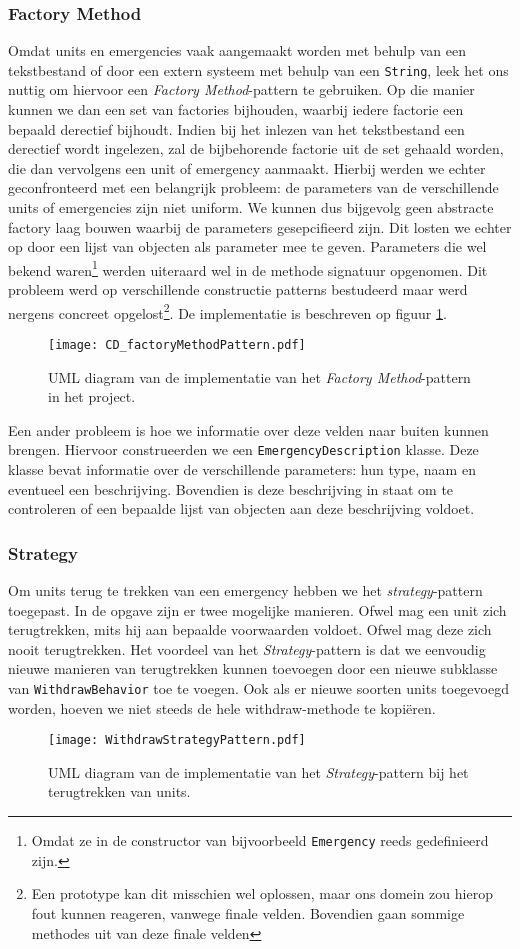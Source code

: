 \subsubsection{Factory Method}
Omdat units en emergencies vaak aangemaakt worden met behulp van een tekstbestand of door een extern systeem met behulp van een \verb+String+, leek het ons nuttig om hiervoor een \textit{Factory Method}-pattern te gebruiken. Op die manier kunnen we dan een set van factories bijhouden, waarbij iedere factorie een bepaald derectief bijhoudt. Indien bij het inlezen van het tekstbestand een derectief wordt ingelezen, zal de bijbehorende factorie uit de set gehaald worden, die dan vervolgens een unit of emergency aanmaakt. Hierbij werden we echter geconfronteerd met een belangrijk probleem: de parameters van de verschillende units of emergencies zijn niet uniform. We kunnen dus bijgevolg geen abstracte factory laag bouwen waarbij de parameters gesepcifieerd zijn. Dit losten we echter op door een lijst van objecten als parameter mee te geven. Parameters die wel bekend waren\footnote{Omdat ze in de constructor van bijvoorbeeld \texttt{Emergency} reeds gedefinieerd zijn.} werden uiteraard wel in de methode signatuur opgenomen. Dit probleem werd op verschillende constructie patterns bestudeerd maar werd nergens concreet opgelost\footnote{Een prototype kan dit misschien wel oplossen, maar ons domein zou hierop fout kunnen reageren, vanwege finale velden. Bovendien gaan sommige methodes uit van deze finale velden}. De implementatie is beschreven op figuur \ref{fig:factoryMethodPattern}.
\begin{figure}[h!]
\texttt{[image: CD\_factoryMethodPattern.pdf]}
\caption{UML diagram van de implementatie van het \textit{Factory Method}-pattern in het project.}
\label{fig:factoryMethodPattern}
\end{figure}
Een ander probleem is hoe we informatie over deze velden naar buiten kunnen brengen. Hiervoor construeerden we een \verb+EmergencyDescription+ klasse. Deze klasse bevat informatie over de verschillende parameters: hun type, naam en eventueel een beschrijving. Bovendien is deze beschrijving in staat om te controleren of een bepaalde lijst van objecten aan deze beschrijving voldoet.
\subsubsection{Strategy}
Om units terug te trekken van een emergency hebben we het \textit{strategy}-pattern toegepast. In de opgave zijn er twee mogelijke manieren.
Ofwel mag een unit zich terugtrekken, mits hij aan bepaalde voorwaarden voldoet. Ofwel mag deze zich nooit terugtrekken.
Het voordeel van het \textit{Strategy}-pattern is dat we eenvoudig nieuwe manieren van terugtrekken kunnen toevoegen door een nieuwe subklasse van \texttt{WithdrawBehavior} toe te voegen.
Ook als er nieuwe soorten units toegevoegd worden, hoeven we niet steeds de hele withdraw-methode te kopi\"eren.
\begin{figure}[h!]
\texttt{[image: WithdrawStrategyPattern.pdf]}
\caption{UML diagram van de implementatie van het \textit{Strategy}-pattern bij het terugtrekken van units.}
\label{fig:withdrawStrategyPattern}
\end{figure}